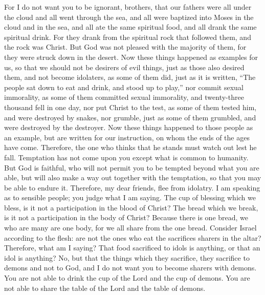 \begin{biblechapter} %
 For I do not want you to be ignorant, brothers, that our fathers were all under the cloud and all went through the sea,
\verse and all were baptized into Moses in the cloud and in the sea,
\verse and all ate the same spiritual food,
\verse and all drank the same spiritual drink. For they drank from the spiritual rock that followed them, and the rock was Christ.
\verse But God was not pleased with the majority of them, for they were struck down in the desert.
\verse Now these things happened as examples for us, so that we should not be desirers of evil things, just as those also desired them,
\verse and not become idolaters, as some of them did, just as it is written, “The people sat down to eat and drink, and stood up to play,”
\verse nor commit sexual immorality, as some of them committed sexual immorality, and twenty-three thousand fell in one day,
\verse nor put Christ to the test, as some of them tested him, and were destroyed by snakes,
\verse nor grumble, just as some of them grumbled, and were destroyed by the destroyer.
\verse Now these things happened to those people as an example, but are written for our instruction, on whom the ends of the ages have come.
\verse Therefore, the one who thinks that he stands must watch out lest he fall.
\verse Temptation has not come upon you except what is common to humanity. But God is faithful, who will not permit you to be tempted beyond what you are able, but will also make a way out together with the temptation, so that you may be able to endure it.
 Therefore, my dear friends, flee from idolatry.
\verse I am speaking as to sensible people; you judge what I am saying.
\verse The cup of blessing which we bless, is it not a participation in the blood of Christ? The bread which we break, is it not a participation in the body of Christ?
\verse Because there is one bread, we who are many are one body, for we all share from the one bread.
\verse Consider Israel according to the flesh: are not the ones who eat the sacrifices sharers in the altar?
\verse Therefore, what am I saying? That food sacrificed to idols is anything, or that an idol is anything?
\verse No, but that the things which they sacrifice, they sacrifice to demons and not to God, and I do not want you to become sharers with demons.
\verse You are not able to drink the cup of the Lord and the cup of demons. You are not able to share the table of the Lord and the table of demons.

\end{biblechapter}
